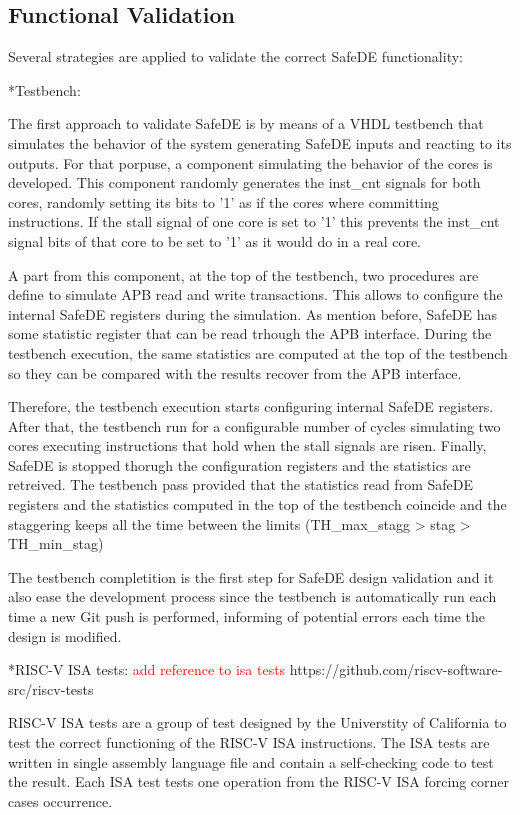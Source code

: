 \subsection{Functional Validation}

Several strategies are applied to validate the correct SafeDE functionality:

*Testbench: 

The first approach to validate SafeDE is by means of a VHDL testbench that simulates the behavior of the system generating SafeDE inputs and reacting to its outputs. For that porpuse, a component simulating the behavior of the cores is developed. This component randomly generates the inst\_cnt signals for both cores, randomly setting its bits to '1' as if the cores where committing instructions. If the stall signal of one core is set to '1' this prevents the inst\_cnt signal bits of that core to be set to '1' as it would do in a real core. 

A part from this component, at the top of the testbench, two procedures are define to simulate APB read and write transactions. This allows to configure the internal SafeDE registers during the simulation. As mention before, SafeDE has some statistic register that can be read trhough the APB interface. During the testbench execution, the same statistics are computed at the top of the testbench so they can be compared with the results recover from the APB interface. 

Therefore, the testbench execution starts configuring internal SafeDE registers. After that, the testbench run for a configurable number of cycles simulating two cores executing instructions that hold when the stall signals are risen. Finally, SafeDE is stopped thorugh the configuration registers and the statistics are retreived. The testbench pass provided that the statistics read from SafeDE registers and the statistics computed in the top of the testbench coincide and the staggering keeps all the time between the limits (TH\_max\_stagg > stag > TH\_min\_stag)

The testbench completition is the first step for SafeDE design validation and it also ease the development process since the testbench is automatically run each time a new Git push is performed, informing of potential errors each time the design is modified.


*RISC-V ISA tests:
\textcolor{red}{add reference to isa tests} https://github.com/riscv-software-src/riscv-tests

RISC-V ISA tests are a group of test designed by the Universtity of California to test the correct functioning of the RISC-V ISA instructions. The ISA tests are written in single assembly language file and contain a self-checking code to test the result. Each ISA test tests one operation from the RISC-V ISA forcing corner cases occurrence. 

